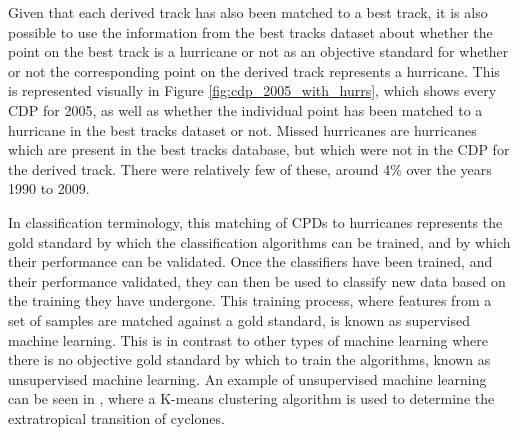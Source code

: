 \documentclass[pdftex,12pt,a4paper]{report}
\begin{document}
Given that each derived track has also been matched to a best track, it is also possible to use the
information from the best tracks dataset about whether the point on the best track is a hurricane or
not as an objective standard for whether or not the corresponding point on the derived track
represents a hurricane. This is represented visually in Figure \ref{fig:cdp_2005_with_hurrs}, which
shows every CDP for 2005, as well as whether the individual point has been matched to a
hurricane in the best tracks dataset or not. Missed hurricanes are hurricanes which are present in
the best tracks database, but which were not in the CDP for the derived track. 
There were relatively few of these, around 4\% over the years 1990 to 2009. 

In classification terminology, this matching of CPDs to hurricanes represents the gold standard by
which the classification algorithms can be trained, and by which their performance can be validated.
Once the classifiers have been trained, and their performance validated, they can then be used to
classify new data based on the training they have undergone. This training process, where features
from a set of samples are matched against a gold standard, is known as supervised machine learning.
This is in contrast to other types of machine learning where there is no objective gold standard by
which to train the algorithms, known as unsupervised machine learning. An example of unsupervised
machine learning can be seen in \textcite{studholme2014objective}, where a K-means clustering
algorithm is used to determine the extratropical transition of cyclones.
\end{document}
